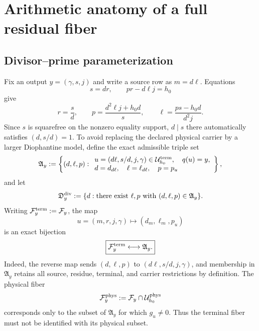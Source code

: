 \section{Arithmetic anatomy of a full residual fiber}
\label{sec:arithmetic-fibers}

\subsection{Divisor--prime parameterization}

Fix an output \(y=(\gamma,s,j)\) and write a source row as
\(m=d\ell\).  Equations
\begin{equation}
 s=dr,
 \qquad
 pr-d\ell j=h_0
 \label{eq:tpc55-fiber-equations}
\end{equation}
give
\begin{equation}
 r=\frac sd,
 \qquad
 p=\frac{d^2\ell j+h_0d}{s},
 \qquad
 \ell=\frac{ps-h_0d}{d^2j}.
 \label{eq:tpc55-fiber-parameterization}
\end{equation}
Since \(s\) is squarefree on the nonzero equality support, \(d\mid s\)
there automatically satisfies \((d,s/d)=1\).  To avoid replacing the
declared physical carrier by a larger Diophantine model, define the exact
admissible triple set
\begin{equation}
 \mathfrak A_y
 :=\left\{(d,\ell,p):
 \begin{array}{l}
 u=(d\ell,s/d,j,\gamma)\in\mathcal U_{h_0}^{\rm term},\quad q(u)=y,\\
 d=d_{d\ell},\quad \ell=\ell_{d\ell},\quad p=p_u
 \end{array}\right\},
 \label{eq:tpc55-admissible-triple-set}
\end{equation}
and let
\begin{equation}
 \mathfrak D_y^{\rm div}
 :=\{d:\text{there exist }\ell,p\text{ with }(d,\ell,p)\in\mathfrak A_y\}.
 \label{eq:tpc55-admissible-divisor-set}
\end{equation}
Writing \(\mathcal F_y^{\rm term}:=\mathcal F_y\), the map
\begin{equation}
 u=(m,r,j,\gamma)
 \longmapsto(d_m,\ell_m,p_u)
 \label{eq:tpc55-exact-fiber-bijection-map}
\end{equation}
is an exact bijection
\begin{equation}
 \boxed{\mathcal F_y^{\rm term}\longleftrightarrow\mathfrak A_y.}
 \label{eq:tpc55-exact-fiber-set}
\end{equation}
Indeed, the reverse map sends \((d,\ell,p)\) to
\((d\ell,s/d,j,\gamma)\), and membership in \(\mathfrak A_y\) retains all
source, residue, terminal, and carrier restrictions by definition.  The
physical fiber
\begin{equation}
 \mathcal F_y^{\rm phys}:=\mathcal F_y\cap\mathcal U_{h_0}^{\rm phys}
 \label{eq:tpc55-physical-fiber-subset}
\end{equation}
corresponds only to the subset of \(\mathfrak A_y\) for which \(g_u\ne0\).
Thus the terminal fiber must not be identified with its physical subset.

